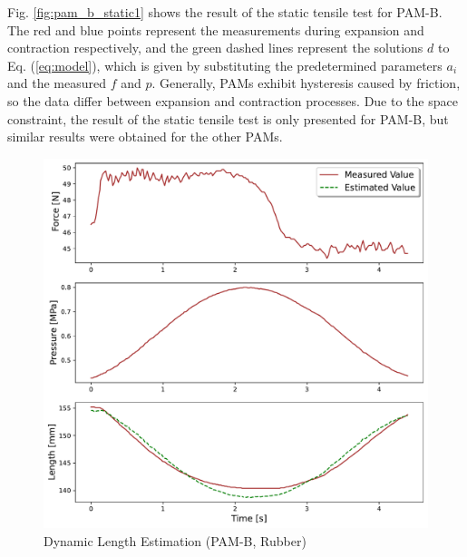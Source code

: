 Fig. \ref{fig:pam_b_static1} shows the result of the static tensile test for PAM-B. The red and blue points represent the measurements during expansion and contraction respectively, and the green dashed lines represent the solutions $d$ to Eq. (\ref{eq:model}), which is given by substituting the predetermined parameters $a_i$ and the measured $f$ and $p$.
Generally, PAMs exhibit hysteresis caused by friction, so the data differ between expansion and contraction processes. Due to the space constraint, the result of the static tensile test is only presented for PAM-B, but similar results were obtained for the other PAMs.
\begin{figure}[h]
   \begin{center}
       \begin{minipage}[t]{\columnwidth} 
           \centering
           \includegraphics[keepaspectratio, width=\columnwidth]{fig/20231207_1_4s_by_5_2d_ieeesensors2.pdf}
           \caption{Dynamic Length Estimation (PAM-B, Rubber)}
           \label{fig:pam_b_dynamic}
       \end{minipage}
       \hfill
       \begin{minipage}[t]{\columnwidth} 
           \centering

\end{minipage}
\end{center}
\end{figure}
